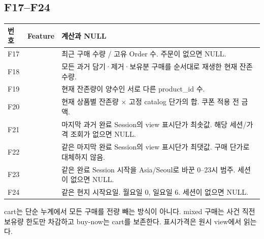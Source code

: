 \documentclass[11pt,a4paper]{article}
\newcommand{\page}{\clearpage}
\newcommand{\thead}{\rowcolor{pale}}
\begin{document}
\subsection*{F17--F24}
\begin{tabularx}{\linewidth}{@{}P{.065\linewidth}P{.36\linewidth}Y@{}}\thead 번호 & Feature & 계산과 NULL\\\midrule
F17 & {\ttfamily\scriptsize{}} & 최근 구매 수량 / 고유 Order 수. 주문이 없으면 NULL. \\[5pt]
F18 & {\ttfamily\scriptsize{}} & 모든 과거 담기·제거·보유분 구매를 순서대로 재생한 현재 잔존 수량. \\[5pt]
F19 & {\ttfamily\scriptsize{}} & 현재 잔존량이 양수인 서로 다른 product\_id 수. \\[5pt]
F20 & {\ttfamily\scriptsize{}} & 현재 상품별 잔존량 × 고정 catalog 단가의 합. 쿠폰 적용 전 금액. \\[5pt]
F21 & {\ttfamily\scriptsize{}} & 마지막 과거 완료 Session의 view 표시단가 최솟값. 해당 세션/가격 조회가 없으면 NULL. \\[5pt]
F22 & {\ttfamily\scriptsize{}} & 같은 마지막 완료 Session의 view 표시단가 최댓값. 구매 단가로 대체하지 않음. \\[5pt]
F23 & {\ttfamily\scriptsize{}} & 같은 완료 Session 시작을 Asia/Seoul로 바꾼 0--23시 범주. 세션이 없으면 NULL. \\[5pt]
F24 & {\ttfamily\scriptsize{}} & 같은 현지 시작요일. 월요일 0, 일요일 6. 세션이 없으면 NULL. \\[5pt]
\bottomrule\end{tabularx}
cart는 단순 누계에서 모든 구매를 전량 빼는 방식이 아니다. mixed 구매는 사건 직전 보유량 한도만 차감하고 buy-now는 cart를 보존한다. 표시가격은 원시 view에서 읽는다.
\page
\end{document}
